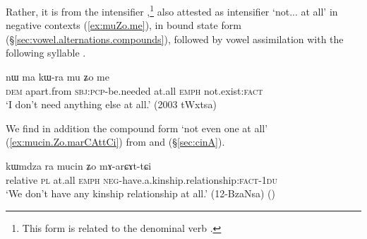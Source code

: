 Rather, it is from the intensifier ,\footnote{This form is related to the denominal verb .  } also attested as intensifier `not... at all' in negative contexts (\ref{ex:muZo.me}), in bound state form  (§\ref{sec:vowel.alternations.compounds}), followed by vowel assimilation with the following syllable .

\begin{exe}
	\ex \label{ex:muZo.me}
	\gll  nɯ ma kɯ-ra mu ʑo me \\
	\textsc{dem} apart.from \textsc{sbj}:\textsc{pcp}-be.needed at.all \textsc{emph} not.exist:\textsc{fact} \\
	\glt `I don't need anything else at all.' (2003 tWxtsa)
\end{exe} 

We find in addition the compound form  `not even one at all' (\ref{ex:mucin.Zo.marCAttCi}) from  and   (§\ref{sec:cinA}).

\begin{exe}
	\ex \label{ex:mucin.Zo.marCAttCi}
	\gll  kɯmdza ra mucin ʑo mɤ-arɕɤt-tɕi  \\
	relative \textsc{pl} at.all \textsc{emph} \textsc{neg}-have.a.kinship.relationship:\textsc{fact}-\textsc{1du} \\
	\glt `We don't have any kinship relationship at all.' (12-BzaNsa)
()
\end{exe} 
